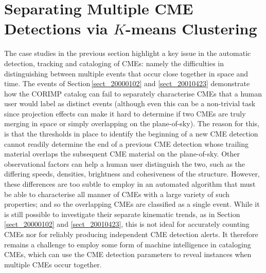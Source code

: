 \documentclass[referee,a4paper,12pt,traditabstract]{swsc}
\begin{document}
\section{Separating Multiple CME Detections via $K$-means Clustering}
\label{sect_clusters}


The case studies in the previous section highlight a key issue in the automatic detection, tracking and cataloging of CMEs: namely the difficulties in distinguishing between multiple events that occur close together in space and time. The events of Section\,\ref{sect_20000102} and \ref{sect_20010423} demonstrate how the CORIMP catalog can fail to separately characterise CMEs that a human user would label as distinct events (although even this can be a non-trivial task since projection effects can make it hard to determine if two CMEs are truly merging in space or simply overlapping on the plane-of-sky). The reason for this, is that the thresholds in place to identify the beginning of a new CME detection cannot readily determine the end of a previous CME detection whose trailing material overlaps the subsequent CME material on the plane-of-sky. Other observational factors can help a human user distinguish the two, such as the differing speeds, densities, brightness and cohesiveness of the structure. However, these differences are too subtle to employ in an automated algorithm that must be able to characterise all manner of CMEs with a large variety of such properties; and so the overlapping CMEs are classified as a single event. While it is still possible to investigate their separate kinematic trends, as in Section\,\ref{sect_20000102} and \ref{sect_20010423}, this is not ideal for accurately counting CMEs nor for reliably producing independent CME detection alerts. It therefore remains a challenge to employ some form of machine intelligence in cataloging CMEs, which can use the CME detection parameters to reveal instances when multiple CMEs occur together.
\end{document}
